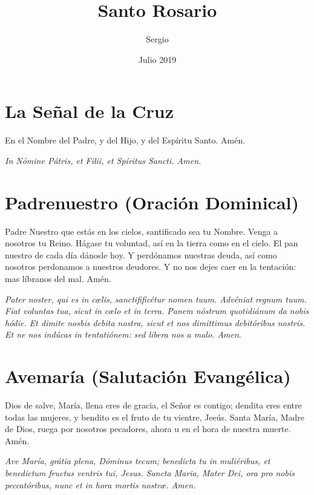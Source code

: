 \documentclass[a4paper,11pt, oneside]{report}
\title{Santo Rosario}
\author{Sergio}
\date{Julio 2019}
\begin{document}
  
\begin{titlepage}
  \maketitle    
\end{titlepage}

\section*{La Señal de la Cruz}

En el Nombre del Padre, y del Hijo, y del Espíritu Santo. Amén.

\medskip

\textit{In Nómine Pátris, et Filii, et Spíritus Sancti. Amen.}

\section*{Padrenuestro (Oración Dominical)}

Padre Nuestro que estás en los cielos, santificado sea tu Nombre. Venga a nosotros tu Reino. Hágase tu voluntad, así en la tierra como
en el cielo. El pan nuestro de cada día dánosle hoy. Y perdónamos nuestras deuda, así como nosotros perdonamos a nuestros deudores.
Y no nos dejes caer en la tentación: mas líbranos del mal. Amén.

\medskip

\textit{Pater noster, qui es in c{\oe}lis, sanctifificétur nomen tuum. Advéniat regnum tuum. Fiat voluntas tua, sicut in c{\oe}lo et in terra.
Panem nóstrum quotidiánum da nobis hódie. Et dimite nosbis debita nostra, sicut et nos dimittimus debitóribus nostris. Et ne nos indúcas
in tentatiónem: sed libera nos a malo. Amen}.


\section*{Avemaría (Salutación Evangélica)}

Dios de salve, María, llena eres de gracia, el Señor es contigo; dendita eres entre todas las mujeres, y bendito es el fruto de tu
vientre, Jeeús. Santa María, Madre de Dios, ruega por nosotros pecadores, ahora u en el hora de nuestra muerte. Amén.

\medskip

\textit{Ave María, grátia plena, Dóminus tecum; benedicta tu in muliéribus, et benedictum fructus ventris tui, Jesus.
Sancta Maria, Mater Dei, ora pro nobis peccatóribus, nunc et in hora mortis nostr{\ae}. Amen.}
\end{document}
